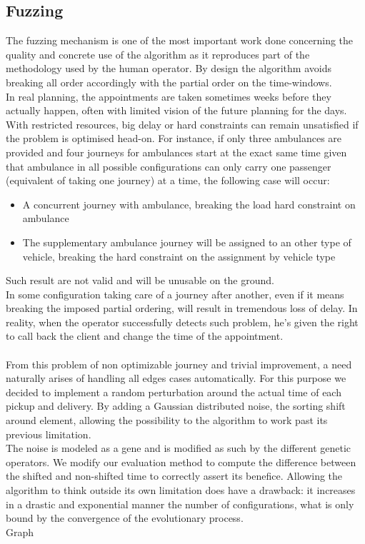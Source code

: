 \documentclass[12pt]{memoir}
\begin{document}
\subsection{Fuzzing}
The fuzzing mechanism is one of the most important work done concerning the quality and concrete use
of the algorithm as it reproduces part of the methodology used by the human operator. By design the algorithm
avoids breaking all order accordingly with the partial order on the time-windows.\\
In real planning, the
appointments are taken sometimes weeks before they actually happen, often with limited vision of the future
planning for the days. With restricted resources, big delay or hard constraints can remain unsatisfied if
the problem is optimised head-on. For instance, if only three ambulances are provided and four journeys for ambulances
start at the exact same time given that ambulance in all possible configurations can only carry one passenger
 (equivalent of taking one journey) at a time, the following case will occur:
\begin{itemize}
  \item A concurrent journey with ambulance, breaking the load hard constraint on ambulance
  \item The supplementary ambulance journey will be assigned to an other type of vehicle,
        breaking the hard constraint on the assignment by vehicle type
\end{itemize}
Such result are not valid and will be unusable on the ground.\\
In some configuration taking care of a journey after another, even if it means breaking the
imposed partial ordering, will result in tremendous loss of delay. In reality, when the operator
successfully detects such problem, he's given the right to call back the client and change the
time of the appointment. \\
\\
From this problem of non optimizable journey and trivial improvement, a need naturally arises of handling
all edges cases automatically. For this purpose we decided to implement a random perturbation around the
actual time of each pickup and delivery. By adding a Gaussian distributed noise, the sorting shift around
element, allowing the possibility to the algorithm to work past its previous limitation.\\
The noise is modeled as a gene and is modified as such by the different genetic operators.
We modify our evaluation method to compute the difference between the shifted and non-shifted time
to correctly assert its benefice. Allowing the algorithm to think outside its own limitation does
have a drawback: it increases in a drastic and exponential manner the number of configurations,
what is only bound by the convergence of the evolutionary process.\\
Graph
\end{document}
